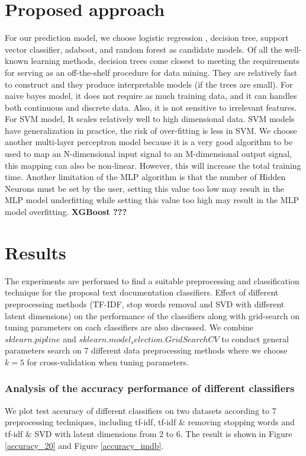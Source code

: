 \documentclass[11pt]{scrartcl}
\begin{document}
\section{Proposed approach}
For our prediction model, we choose logistic regression , decision tree, support vector classifier, adaboot, and random forest as candidate models. Of all the well-known learning methods, decision trees come closest to meeting the requirements for serving as an off-the-shelf procedure for data mining. They are relatively fast to construct and they produce interpretable models (if the trees are small). For naive bayes model, it does not require as much training data, and it can handles both continuous and discrete data. Also, it is not sensitive to irrelevant features. For SVM model, It scales relatively well to high dimensional data. SVM models have generalization in practice, the risk of over-fitting is less in SVM. We choose another multi-layer perceptron model because it is a very good algorithm to be used to map an N-dimensional input signal to an M-dimensional output signal, this mapping can also be non-linear.  However, this will increase the total training time. Another limitation of the MLP algorithm is that the number of Hidden Neurons must be set by the user, setting this value too low may result in the MLP model underfitting while setting this value too high may result in the MLP model overfitting. \textbf{XGBoost ???}




\section{Results}

The experiments are performed to find a suitable preprocessing and classification technique for the proposal text documentation classifiers. Effect of different preprocessing methods (TF-IDF, stop words removal and SVD with different latent dimensions) on the performance of the classifiers along with grid-search on tuning parameters on each classifiers are also discussed. We combine $sklearn.pipline$ and $sklearn.model_selection.GridSearchCV$ to conduct general parameters search on 7 different data preprocessing methods where we choose $k=5$ for cross-validation when tuning parameters. 

\subsubsection*{Analysis of the accuracy performance of different classifiers}
We plot test accuracy of different classifiers on two datasets according to 7 preprocessing techniques, including tf-idf, tf-idf \& removing stopping words and tf-idf \& SVD with latent dimensions from 2 to 6. The result is shown in Figure \ref{accuracy_20} and Figure \ref{accuracy_imdb}.
\end{document}
